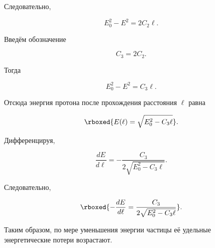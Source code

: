 \documentclass[../final.tex]{subfiles}
\begin{document}
Следовательно,

\begin{equation*}
    E_0^2-E^2
    =
    2C_2\ell.
\end{equation*}

Введём обозначение

\begin{equation*}
    C_3
    =
    2C_2.
\end{equation*}

Тогда

\begin{equation*}
    E_0^2-E^2
    =
    C_3\ell.
\end{equation*}

Отсюда энергия протона после прохождения расстояния $\ell$ равна

\begin{equation*}
    \rboxed{
        E(\ell)
        =
        \sqrt{
            E_0^2-C_3\ell
        }
    }.
\end{equation*}

Дифференцируя,

\begin{equation*}
    \frac{dE}{d\ell}
    =
    -
    \frac{
        C_3
    }{
        2
        \sqrt{
            E_0^2-C_3\ell
        }
    }.
\end{equation*}

Следовательно,

\begin{equation*}
    \rboxed{
        -
        \frac{dE}{d\ell}
        =
        \frac{
            C_3
        }{
            2
            \sqrt{
                E_0^2-C_3\ell
            }
        }
    }.
\end{equation*}

Таким образом, по мере уменьшения энергии частицы
её удельные энергетические потери возрастают.
\end{document}

